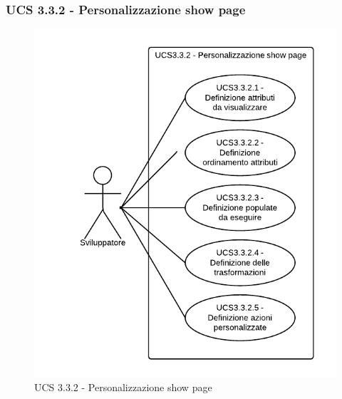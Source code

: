 \subsubsection{UCS 3.3.2 - Personalizzazione show page} 
    \begin{figure}[H]
      \begin{center}
      \includegraphics[width=12cm]{UML/UCS 3.3.2 - Personalizzazione show page.png}
      \caption{UCS 3.3.2 - Personalizzazione show page}
      \end{center} 
    \end{figure}  
    

